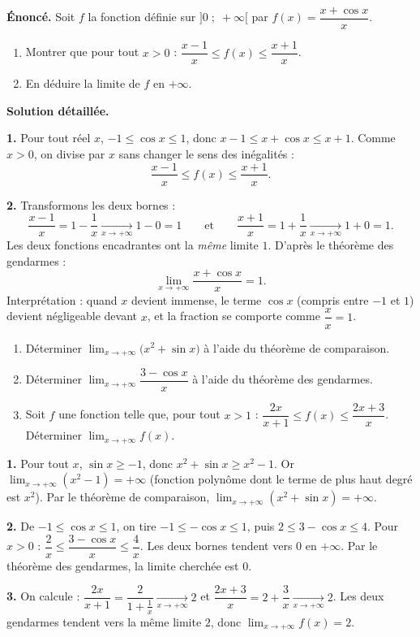 \documentclass[11pt]{article}
\begin{document}
\begin{exoresolu}
\textbf{Énoncé.} Soit $f$ la fonction définie sur $]0\;;\;+\infty[$ par $f(x) = \dfrac{x + \cos x}{x}$.
\begin{enumerate}
\item Montrer que pour tout $x > 0$ : $\dfrac{x-1}{x} \leq f(x) \leq \dfrac{x+1}{x}$.
\item En déduire la limite de $f$ en $+\infty$.
\end{enumerate}
\tcblower
\textbf{Solution détaillée.}

\textbf{1.} Pour tout réel $x$, $-1 \leq \cos x \leq 1$, donc $x - 1 \leq x + \cos x \leq x + 1$. Comme $x > 0$, on divise par $x$ sans changer le sens des inégalités :
\[ \frac{x-1}{x} \leq f(x) \leq \frac{x+1}{x}. \]

\textbf{2.} Transformons les deux bornes :
\[ \frac{x-1}{x} = 1 - \frac{1}{x} \xrightarrow[x\to+\infty]{} 1 - 0 = 1 \qquad \text{et} \qquad \frac{x+1}{x} = 1 + \frac{1}{x} \xrightarrow[x\to+\infty]{} 1 + 0 = 1. \]
Les deux fonctions encadrantes ont la \emph{même} limite $1$. D'après le théorème des gendarmes :
\[ \lim_{x\to+\infty} \frac{x + \cos x}{x} = 1. \]
Interprétation : quand $x$ devient immense, le terme $\cos x$ (compris entre $-1$ et $1$) devient négligeable devant $x$, et la fraction se comporte comme $\dfrac{x}{x} = 1$.
\end{exoresolu}

\begin{exercice}
\begin{enumerate}
\item Déterminer $\displaystyle\lim_{x\to+\infty} \bigl(x^2 + \sin x\bigr)$ à l'aide du théorème de comparaison.
\item Déterminer $\displaystyle\lim_{x\to+\infty} \dfrac{3 - \cos x}{x}$ à l'aide du théorème des gendarmes.
\item Soit $f$ une fonction telle que, pour tout $x > 1$ : $\dfrac{2x}{x+1} \leq f(x) \leq \dfrac{2x+3}{x}$. Déterminer $\displaystyle\lim_{x\to+\infty} f(x)$.
\end{enumerate}
\end{exercice}

\begin{corrige}[Exercice]
\textbf{1.} Pour tout $x$, $\sin x \geq -1$, donc $x^2 + \sin x \geq x^2 - 1$. Or $\displaystyle\lim_{x\to+\infty} (x^2 - 1) = +\infty$ (fonction polynôme dont le terme de plus haut degré est $x^2$). Par le théorème de comparaison, $\displaystyle\lim_{x\to+\infty} (x^2 + \sin x) = +\infty$.

\textbf{2.} De $-1 \leq \cos x \leq 1$, on tire $-1 \leq -\cos x \leq 1$, puis $2 \leq 3 - \cos x \leq 4$. Pour $x > 0$ : $\dfrac{2}{x} \leq \dfrac{3-\cos x}{x} \leq \dfrac{4}{x}$. Les deux bornes tendent vers $0$ en $+\infty$. Par le théorème des gendarmes, la limite cherchée est $0$.

\textbf{3.} On calcule : $\dfrac{2x}{x+1} = \dfrac{2}{1+\frac{1}{x}} \xrightarrow[x\to+\infty]{} 2$ et $\dfrac{2x+3}{x} = 2 + \dfrac{3}{x} \xrightarrow[x\to+\infty]{} 2$. Les deux gendarmes tendent vers la même limite $2$, donc $\displaystyle\lim_{x\to+\infty} f(x) = 2$.
\end{corrige}
\end{document}
